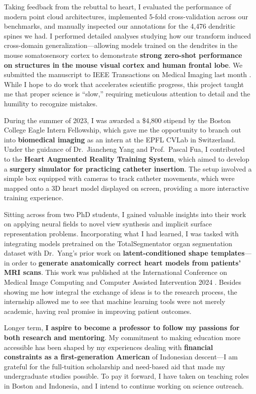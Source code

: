 \documentclass[letterpaper,11pt]{article}
\begin{document}
Taking feedback from the rebuttal to heart, I evaluated the performance of modern point cloud architectures, implemented 5-fold cross-validation across our benchmarks, and manually inspected our annotations for the 4,476 dendritic spines we had. I performed detailed analyses studying how our transform induced cross-domain generalization---allowing models trained on the dendrites in the mouse somatosensory cortex to demonstrate \textbf{strong zero-shot performance on structures in the mouse visual cortex and human frontal lobe}. We submitted the manuscript to IEEE Transactions on Medical Imaging last month . While I hope to do work that accelerates scientific progress, this project taught me that proper science is “slow,” requiring meticulous attention to detail and the humility to recognize mistakes.

During the summer of 2023, I was awarded a \$4,800 stipend by the Boston College Eagle Intern Fellowship, which gave me the opportunity to branch out into \textbf{biomedical imaging} as an intern at the EPFL CVLab in Switzerland. Under the guidance of Dr.\ Jiancheng Yang and Prof.\ Pascal Fua, I contributed to the \textbf{Heart Augmented Reality Training System}, which aimed to develop a \textbf{surgery simulator for practicing catheter insertion}. The setup involved a simple box equipped with cameras to track catheter movements, which were mapped onto a 3D heart model displayed on screen, providing a more interactive training experience.

Sitting across from two PhD students, I gained valuable insights into their work on applying neural fields to novel view synthesis and implicit surface representation problems. Incorporating what I had learned, I was tasked with integrating models pretrained on the TotalSegmentator organ segmentation dataset with Dr.\ Yang’s prior work on \textbf{latent-conditioned shape templates}---in order to \textbf{generate anatomically correct heart models from patients’ MRI scans}. This work was published at the International Conference on Medical Image Computing and Computer Assisted Intervention 2024 . Besides showing me how integral the exchange of ideas is to the research process, the internship allowed me to see that machine learning tools were not merely academic, having real promise in improving patient outcomes.

Longer term, \textbf{I aspire to become a professor to follow my passions for both research and mentoring}. My commitment to making education more accessible has been shaped by my experiences dealing with \textbf{financial constraints as a first-generation American} of Indonesian descent---I am grateful for the full-tuition scholarship and need-based aid that made my undergraduate studies possible. To pay it forward, I have taken on teaching roles in Boston and Indonesia, and I intend to continue working on science outreach.
\end{document}
